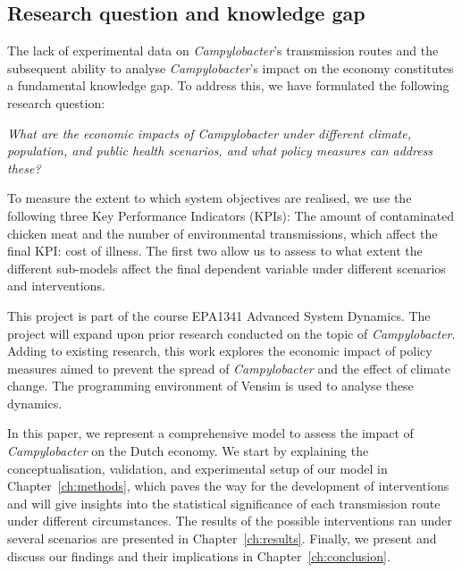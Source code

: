 
\subsection*{Research question and knowledge gap}

The lack of experimental data on \textit{Campylobacter}’s transmission routes and the subsequent ability to analyse \textit{Campylobacter}’s impact on the economy constitutes a fundamental knowledge gap. To address this, we have formulated the following research question:
\begin{center}\textit{\textcolor{NiceBlue}{
What are the economic impacts of Campylobacter under different climate, population, and public health scenarios, and what policy measures can address these? 
}}
\end{center}
To measure the extent to which system objectives are realised, we use the following three Key Performance Indicators (KPIs): The amount of contaminated chicken meat and the number of environmental transmissions, which affect the final KPI: cost of illness. The first two allow us to assess to what extent the different sub-models affect the final dependent variable under different scenarios and interventions.

This project is part of the course EPA1341 Advanced System Dynamics. The project will expand upon prior research conducted on the topic of \textit{Campylobacter}. Adding to existing research, this work explores the economic impact of policy measures aimed to prevent the spread of  \textit{Campylobacter} and the effect of climate change. The programming environment of Vensim is used to analyse these dynamics. 

In this paper, we represent a comprehensive model to assess the impact of \textit{Campylobacter} on the Dutch economy. We start by explaining the conceptualisation, validation, and experimental setup of our model in Chapter~\ref{ch:methods}, which paves the way for the development of interventions and will give insights into the statistical significance of each transmission route under different circumstances. The results of the possible interventions ran under several scenarios are presented in Chapter~\ref{ch:results}. Finally, we present and discuss our findings and their implications in Chapter~\ref{ch:conclusion}.

